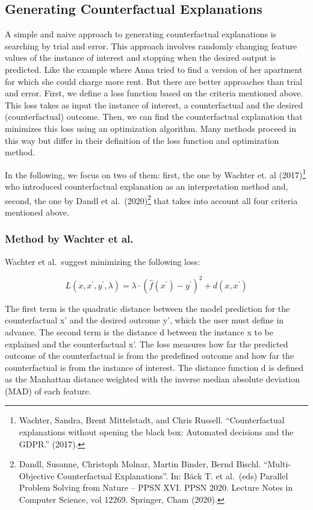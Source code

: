 \documentclass[
  12pt,
]{krantz}
\begin{document}
\hypertarget{generating-counterfactual-explanations}{%
\subsection{Generating Counterfactual Explanations}\label{generating-counterfactual-explanations}}

A simple and naive approach to generating counterfactual explanations is searching by trial and error.
This approach involves randomly changing feature values of the instance of interest and stopping when the desired output is predicted.
Like the example where Anna tried to find a version of her apartment for which she could charge more rent.
But there are better approaches than trial and error.
First, we define a loss function based on the criteria mentioned above.
This loss takes as input the instance of interest, a counterfactual and the desired (counterfactual) outcome.
Then, we can find the counterfactual explanation that minimizes this loss using an optimization algorithm.
Many methods proceed in this way but differ in their definition of the loss function and optimization method.

In the following, we focus on two of them: first, the one by Wachter et. al (2017)\footnote{Wachter, Sandra, Brent Mittelstadt, and Chris Russell. ``Counterfactual explanations without opening the black box: Automated decisions and the GDPR.'' (2017).} who introduced counterfactual explanation as an interpretation method and, second, the one by Dandl et al.~(2020)\footnote{Dandl, Susanne, Christoph Molnar, Martin Binder, Bernd Bischl. ``Multi-Objective Counterfactual Explanations''. In: Bäck T. et al.~(eds) Parallel Problem Solving from Nature -- PPSN XVI. PPSN 2020. Lecture Notes in Computer Science, vol 12269. Springer, Cham (2020).} that takes into account all four criteria mentioned above.

\hypertarget{method-by-wachter-et-al.}{%
\subsubsection{Method by Wachter et al.~}\label{method-by-wachter-et-al.}}

Wachter et al.~suggest minimizing the following loss:

\[L(x,x^\prime,y^\prime,\lambda)=\lambda\cdot(\hat{f}(x^\prime)-y^\prime)^2+d(x,x^\prime)\]

The first term is the quadratic distance between the model prediction for the counterfactual x' and the desired outcome y', which the user must define in advance.
The second term is the distance d between the instance x to be explained and the counterfactual x'.
The loss measures how far the predicted outcome of the counterfactual is from the predefined outcome and how far the counterfactual is from the instance of interest.
The distance function d is defined as the Manhattan distance weighted with the inverse median absolute deviation (MAD) of each feature.
\end{document}
